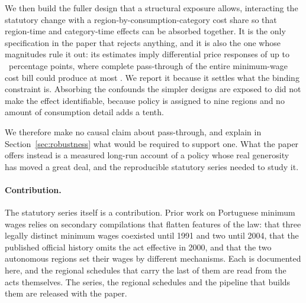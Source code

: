 We then build the fuller design that a structural exposure allows, interacting
the statutory change with a region-by-consumption-category cost share so that
region-time and category-time effects can be absorbed together. It is the only
specification in the paper that rejects anything, and it is also the one whose
magnitudes rule it out: its estimates imply differential price responses of up
to \StructuralPeakResponsePP{}~percentage points, where complete pass-through of
the entire minimum-wage cost bill could produce at most
\StructuralPassThroughCeilingPP{}. We report it because it settles what the
binding constraint is. Absorbing the confounds the simpler designs are exposed
to did not make the effect identifiable, because policy is assigned to nine
regions and no amount of consumption detail adds a tenth.

We therefore make no causal claim about pass-through, and explain in
Section~\ref{sec:robustness} what would be required to support one. What the
paper offers instead is a measured long-run account of a policy whose real
generosity has moved a great deal, and the reproducible statutory series needed
to study it.

\paragraph{Contribution.} The statutory series itself is a contribution. Prior
work on Portuguese minimum wages relies on secondary compilations that flatten
features of the law: that three legally distinct minimum wages coexisted until
1991 and two until 2004, that the published official history omits the act
effective in 2000, and that the two autonomous regions set their wages by
different mechanisms. Each is documented here, and the regional schedules that
carry the last of them are read from the acts themselves. The series, the
regional schedules and the pipeline that builds them are released with the
paper.
